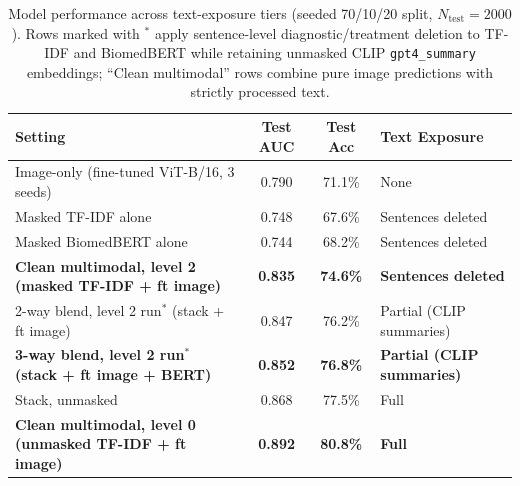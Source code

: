 \begin{table}[h]
\centering
\caption{Model performance across text-exposure tiers (seeded 70/10/20 split, $N_{\text{test}}=2000$). Rows marked with $^*$ apply sentence-level diagnostic/treatment deletion to TF-IDF and BiomedBERT while retaining unmasked CLIP \texttt{gpt4\_summary} embeddings; ``Clean multimodal'' rows combine pure image predictions with strictly processed text.}
\small
\begin{tabular}{lccl}
\toprule
\textbf{Setting} & \textbf{Test AUC} & \textbf{Test Acc} & \textbf{Text Exposure} \\
\midrule
Image-only (fine-tuned ViT-B/16, 3 seeds) & 0.790 & 71.1\% & None \\
Masked TF-IDF alone & 0.748 & 67.6\% & Sentences deleted \\
Masked BiomedBERT alone & 0.744 & 68.2\% & Sentences deleted \\
\textbf{Clean multimodal, level 2 (masked TF-IDF + ft image)} & \textbf{0.835} & \textbf{74.6\%} & \textbf{Sentences deleted} \\
2-way blend, level 2 run$^*$ (stack + ft image) & 0.847 & 76.2\% & Partial (CLIP summaries) \\
\textbf{3-way blend, level 2 run$^*$ (stack + ft image + BERT)} & \textbf{0.852} & \textbf{76.8\%} & \textbf{Partial (CLIP summaries)} \\
Stack, unmasked & 0.868 & 77.5\% & Full \\
\textbf{Clean multimodal, level 0 (unmasked TF-IDF + ft image)} & \textbf{0.892} & \textbf{80.8\%} & \textbf{Full} \\
\bottomrule
\end{tabular}
\end{table}